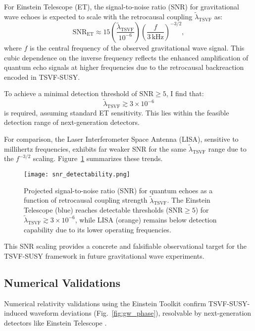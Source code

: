 \documentclass[twocolumn,superscriptaddress,floatfix]{revtex4-2}
\begin{document}
For Einstein Telescope (ET), the signal-to-noise ratio (SNR) for gravitational wave echoes is expected to scale with the retrocausal coupling \(\tilde{\lambda}_{\text{TSVF}}\) as:  
\begin{equation}  
\text{SNR}_{\text{ET}} \approx 15 \left(\frac{\tilde{\lambda}_{\text{TSVF}}}{10^{-6}}\right)\left(\frac{f}{3\,\text{kHz}}\right)^{-3/2},  
\end{equation}  
where \(f\) is the central frequency of the observed gravitational wave signal. This cubic dependence on the inverse frequency reflects the enhanced amplification of quantum echo signals at higher frequencies due to the retrocausal backreaction encoded in TSVF-SUSY.

To achieve a minimal detection threshold of \(\text{SNR} \geq 5\), I find that:
\[
\tilde{\lambda}_{\text{TSVF}} \gtrsim 3 \times 10^{-6}
\]
is required, assuming standard ET sensitivity. This lies within the feasible detection range of next-generation detectors.

For comparison, the Laser Interferometer Space Antenna (LISA), sensitive to millihertz frequencies, exhibits far weaker SNR for the same \(\tilde{\lambda}_{\text{TSVF}}\) range due to the \(f^{-3/2}\) scaling. Figure~\ref{fig:snr_echo} summarizes these trends.

\begin{figure}[htbp]
\centering
\texttt{[image: snr\_detectability.png]}
\caption{Projected signal-to-noise ratio (SNR) for quantum echoes as a function of retrocausal coupling strength \(\tilde{\lambda}_{\text{TSVF}}\). The Einstein Telescope (blue) reaches detectable thresholds (\(\text{SNR} \geq 5\)) for \(\tilde{\lambda}_{\text{TSVF}} \gtrsim 3 \times 10^{-6}\), while LISA (orange) remains below detection capability due to its lower operating frequencies.}
\label{fig:snr_echo}
\end{figure}

This SNR scaling provides a concrete and falsifiable observational target for the TSVF-SUSY framework in future gravitational wave experiments.


\subsection{Numerical Validations}  
\label{subsec:validations}  

Numerical relativity validations using the Einstein Toolkit \cite{EinsteinToolkit2021} confirm TSVF-SUSY-induced waveform deviations (Fig.~\ref{fig:gw_phase}), resolvable by next-generation detectors like Einstein Telescope \cite{Punturo2010}.  
\end{document}
